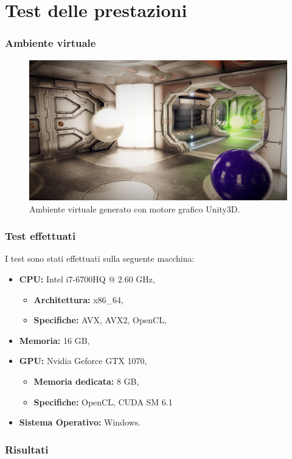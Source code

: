 \documentclass{beamer}
\begin{document}
\section{Test delle prestazioni}
\begin{frame}
\frametitle{Ambiente virtuale}
\begin{figure}[h!]
	\centering
	\includegraphics[width=320pt]{imgs/zona2.png}
	\caption{Ambiente virtuale generato con motore grafico Unity3D.}
	\label{vis:virtual}
\end{figure} 
\end{frame}

\begin{frame}
\frametitle{Test effettuati}
I test sono stati effettuati sulla seguente macchina:
\begin{itemize}
	\item \textbf{CPU:} Intel i7-6700HQ @ 2.60 GHz,
	\begin{itemize}
		\item \textbf{Architettura:} x86\_64, 
		\item \textbf{Specifiche:} AVX, AVX2, OpenCL,
	\end{itemize}		
	\item \textbf{Memoria:} 16 GB, 
	\item \textbf{GPU:} Nvidia Geforce GTX 1070,
	\begin{itemize}
		\item \textbf{Memoria dedicata:} 8 GB, 
		\item \textbf{Specifiche:} OpenCL, CUDA SM 6.1
	\end{itemize}			
	\item \textbf{Sistema Operativo:}  Windows.	 
\end{itemize}
\end{frame}

\begin{frame}
\frametitle{Risultati}
\end{frame}
\end{document}
